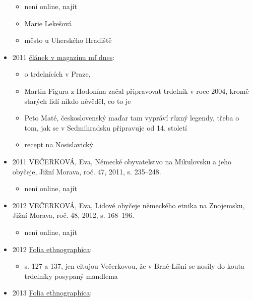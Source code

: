 \begin{itemize}
  \begin{itemize}
  \tightlist
  \item
    není online, najít
  \item
    Marie Lekešová
  \item
    město u Uherského Hradiště
  \end{itemize}
\item
  2011
  \href{https://ndk.cz/view/uuid:cc17ef80-fa5e-11e7-9854-5ef3fc9ae867?page=uuid\%3A5f880b20-fa6d-11e7-9854-5ef3fc9ae867}{článek
  v magazínu mf dnes}:

  \begin{itemize}
  \tightlist
  \item
    o trdelnících v Praze,
  \item
    Martin Figura z Hodonína začal připravovat trdelník v roce 2004,
    kromě starých lidí nikdo něvěděl, co to je
  \item
    Peťo Maté, československý maďar tam vypráví různý legendy, třeba o
    tom, jak se v Sedmihradsku připravuje od 14. století
  \item
    recept na Nosislavický
  \end{itemize}
\item
  2011 VEČERKOVÁ, Eva, Německé obyvatelstvo na Mikulovsku a jeho
  obyčeje, Jižní Morava, roč. 47, 2011, s. 235--248.

  \begin{itemize}
  \tightlist
  \item
    není online, najít
  \end{itemize}
\item
  2012 VEČERKOVÁ, Eva, Lidové obyčeje německého etnika na Znojemsku,
  Jižní Morava, roč. 48, 2012, s. 168--196.

  \begin{itemize}
  \tightlist
  \item
    není online, najít
  \end{itemize}
\item
  2012
  \href{https://www.digitalniknihovna.cz/mzk/uuid/uuid:40699a90-4f78-11e4-a830-005056827e51}{Folia
  ethnographica}:

  \begin{itemize}
  \tightlist
  \item
    s. 127 a 137, jen citujou Večerkovou, že v Brně-Líšni se nosily do
    kouta trdelníky posypaný mandlema
  \end{itemize}
\item
  2013
  \href{https://ndk.cz/view/uuid:1b545920-4f78-11e4-a830-005056827e51?page=uuid:226078c0-5c34-11e4-a6f0-5ef3fc9ae867}{Folia
  ethnographica}:


\end{itemize}
